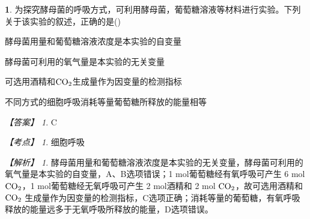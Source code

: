 \documentclass[UTF8, 10pt, a4paper, oneside]{ctexart}
\theoremstyle{definition}
\newtheorem{exercise}{}
\theoremstyle{remark}
\newtheorem*{answer}{【答案】}
\newtheorem*{point}{【考点】}      %
\newtheorem*{explanation}{【解析】}     %
\theoremstyle{plain}
\begin{document}
\begin{exercise}
为探究酵母菌的呼吸方式，可利用酵母菌，葡萄糖溶液等材料进行实验。下列关于该实验的叙述，正确的是\quad(\quad)
    \begin{adjustwidth}{2em}{}
            \begin{asparaenum}[A. ]
                \item 酵母菌用量和葡萄糖溶液浓度是本实验的自变量
                \item 酵母菌可利用的氧气量是本实验的无关变量
                \item 可选用酒精和$\ce{CO2}$生成量作为因变量的检测指标
                \item 不同方式的细胞呼吸消耗等量葡萄糖所释放的能量相等
            \end{asparaenum}
    \end{adjustwidth}
    \begin{answer}
        C
    \end{answer}
    \begin{point}
        细胞呼吸
    \end{point}
    \begin{explanation}
        酵母菌用量和葡萄糖溶液浓度是本实验的无关变量，酵母菌可利用的氧气量是本实验的自变量，A、B选项错误；1 mol葡萄糖经有氧呼吸可产生 6 mol $\ce{CO2}$，1 mol葡萄糖经无氧呼吸可产生 2 mol酒精和 2 mol $\ce{CO2}$，故可选用酒精和 $\ce{CO2}$ 生成量作为因变量的检测指标，C选项正确；消耗等量的葡萄糖，有氧呼吸释放的能量远多于无氧呼吸所释放的能量，D选项错误。
    \end{explanation}
\end{exercise}

\newpage
\end{document}
